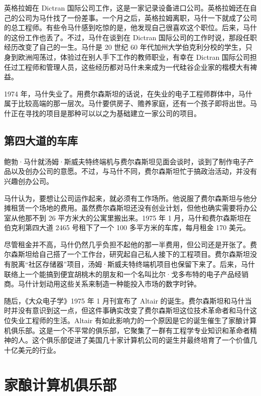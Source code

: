 \documentclass[12pt,UTF8]{ctexbook}
\begin{document}
英格拉姆在 Dictran 国际公司工作，这是一家记录设备进口公司。英格拉姆还在自己的公司为马什找了一份差事。一个月之后，英格拉姆离职，马什一下就成了公司的总工程师。有些令马什感到吃惊的是，他发现自己很喜欢这个职位。后来，马什的这份工作也丢了。不过，马什在谈到在 Dictran 国际公司的工作时说，那段任职经历改变了自己的一生。马什是 20 世纪 60 年代加州大学伯克利分校的学生，只身到欧洲闯荡过，体验过在别人手下工作的教师职业，有幸在 Dictran 国际公司担任过工程师和管理人员，这些经历都对马什未来成为一代硅谷企业家的楷模大有裨益。

1974 年，马什失业了。用费尔森斯坦的话说，在失业的电子工程师群体中，马什属于比较高端的那一层次。马什要供房子、赡养家庭，还有一个孩子即将出世。马什正在寻找的项目是那种可以以之为基础建立一家公司的项目。





\subsection{第四大道的车库}


鲍勃·马什就汤姆·斯威夫特终端机与费尔森斯坦见面会谈时，谈到了制作电子产品以及创办公司的意愿。不过，与马什不同，费尔森斯坦忙于搞政治活动，并没有兴趣创办公司。

马什认为，要想让公司运作起来，就必须有工作场所。他说服了费尔森斯坦与他分摊租赁一个场地的费用。虽然费尔森斯坦还没有创业计划，但他也确实需要将办公室从他那不到 26 平方米大的公寓里搬出来。1975 年 1 月，马什和费尔森斯坦在伯克利第四大道 2465 号租下了一个 100 多平方米的车库，每月租金 170 美元。

尽管租金并不高，马什仍然几乎负担不起他的那一半费用，但公司还是开张了。费尔森斯坦给自己搭了一个工作台，研究起自己私人接下的工程项目。费尔森斯坦没有脱离“社区存储器”项目，汤姆·斯威夫特终端机项目也保留下来了。后来，马什联络上一个能搞到便宜胡桃木的朋友和一个名叫比尔·戈多布特的电子产品经销商。马什计划动用这些关系来制造一种能投入市场的数字时钟。

随后，《大众电子学》1975 年 1 月刊宣布了 Altair 的诞生。费尔森斯坦和马什当时并没有意识到这一点，但这件事确实改变了费尔森斯坦这位技术革命者和马什这位失业工程师的生活。Altair 有如此影响力的一个原因是它的诞生催生了家酿计算机俱乐部。这是一个不平常的俱乐部，它聚集了一群有工程学专业知识和革命者精神的人。这个俱乐部促进了美国几十家计算机公司的诞生并最终培育了一个价值几十亿美元的行业。





\section{家酿计算机俱乐部}
\end{document}

